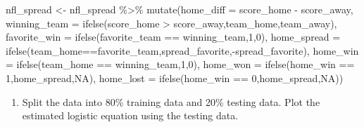 \documentclass[
  11pt,
]{book}
\newenvironment{Shaded}{\begin{snugshade}}{\end{snugshade}}
\newcommand{\AttributeTok}[1]{\textcolor[rgb]{0.77,0.63,0.00}{#1}}
\newcommand{\ConstantTok}[1]{\textcolor[rgb]{0.00,0.00,0.00}{#1}}
\newcommand{\DecValTok}[1]{\textcolor[rgb]{0.00,0.00,0.81}{#1}}
\newcommand{\FloatTok}[1]{\textcolor[rgb]{0.00,0.00,0.81}{#1}}
\newcommand{\FunctionTok}[1]{\textcolor[rgb]{0.00,0.00,0.00}{#1}}
\newcommand{\NormalTok}[1]{#1}
\newcommand{\OtherTok}[1]{\textcolor[rgb]{0.56,0.35,0.01}{#1}}
\newcommand{\SpecialCharTok}[1]{\textcolor[rgb]{0.00,0.00,0.00}{#1}}
\providecommand{\tightlist}{%
  \setlength{\itemsep}{0pt}\setlength{\parskip}{0pt}}
\theoremstyle{definition}
\theoremstyle{definition}
\theoremstyle{definition}
\theoremstyle{definition}
\theoremstyle{remark}
\begin{document}
\begin{Shaded}
\begin{Highlighting}[]
\NormalTok{nfl\_spread }\OtherTok{\textless{}{-}}\NormalTok{ nfl\_spread }\SpecialCharTok{\%\textgreater{}\%} 
  \FunctionTok{mutate}\NormalTok{(}\AttributeTok{home\_diff =}\NormalTok{ score\_home }\SpecialCharTok{{-}}\NormalTok{ score\_away,}
         \AttributeTok{winning\_team =} \FunctionTok{ifelse}\NormalTok{(score\_home }\SpecialCharTok{\textgreater{}}\NormalTok{ score\_away,team\_home,team\_away),}
         \AttributeTok{favorite\_win =} \FunctionTok{ifelse}\NormalTok{(favorite\_team }\SpecialCharTok{==}\NormalTok{ winning\_team,}\DecValTok{1}\NormalTok{,}\DecValTok{0}\NormalTok{),}
         \AttributeTok{home\_spread =} \FunctionTok{ifelse}\NormalTok{(team\_home}\SpecialCharTok{==}\NormalTok{favorite\_team,spread\_favorite,}\SpecialCharTok{{-}}\NormalTok{spread\_favorite),}
         \AttributeTok{home\_win =} \FunctionTok{ifelse}\NormalTok{(team\_home }\SpecialCharTok{==}\NormalTok{ winning\_team,}\DecValTok{1}\NormalTok{,}\DecValTok{0}\NormalTok{),}
         \AttributeTok{home\_won =} \FunctionTok{ifelse}\NormalTok{(home\_win }\SpecialCharTok{==} \DecValTok{1}\NormalTok{,home\_spread,}\ConstantTok{NA}\NormalTok{),}
         \AttributeTok{home\_lost =} \FunctionTok{ifelse}\NormalTok{(home\_win }\SpecialCharTok{==} \DecValTok{0}\NormalTok{,home\_spread,}\ConstantTok{NA}\NormalTok{))}
\end{Highlighting}
\end{Shaded}

\newpage

\begin{enumerate}
\def\labelenumi{(\alph{enumi})}
\setcounter{enumi}{1}
\tightlist
\item
  Split the data into 80\% training data and 20\% testing data. Plot the estimated logistic equation using the testing data.
\end{enumerate}

\begin{Shaded}
\end{Shaded}
\end{document}

